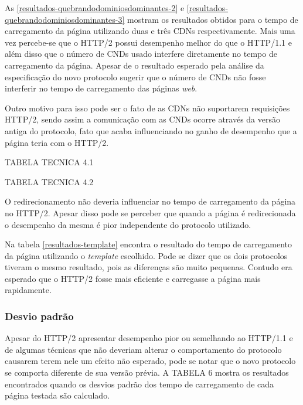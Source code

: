 



As \autoref{resultados-quebrandodominiosdominantes-2} e \autoref{resultados-quebrandodominiosdominantes-3} mostram os resultados obtidos para o tempo de carregamento da página utilizando duas e três CDNs respectivamente. Mais uma vez percebe-se que o HTTP/2 possui desempenho melhor do que o HTTP/1.1 e além disso que o número de CNDs usado interfere diretamente no tempo de carregamento da página. Apesar de o resultado esperado pela análise da especificação do novo protocolo sugerir que o número de CNDs não fosse interferir no tempo de carregamento das páginas \textit{web}.

Outro motivo para isso pode ser o fato de as CDNs não suportarem requisições HTTP/2, sendo assim a comunicação com as CNDs ocorre através da versão antiga do protocolo, fato que acaba influenciando no ganho de desempenho que a página teria com o HTTP/2.

TABELA TECNICA 4.1

TABELA TECNICA 4.2

O redirecionamento não deveria influenciar no tempo de carregamento da página no HTTP/2. Apesar disso pode se perceber que quando a página é redirecionada o desempenho da mesma é pior independente do protocolo utilizado.



Na tabela \autoref{resultados-template} encontra o resultado do tempo de carregamento da página utilizando o \textit{template} escolhido. Pode se dizer que os dois protocolos tiveram o mesmo resultado, pois as diferenças são muito pequenas. Contudo era esperado que o HTTP/2 fosse mais eficiente e carregasse a página mais rapidamente.

\subsubsection{Desvio padrão}
\label{desviopadrao}

Apesar do HTTP/2 apresentar desempenho pior ou semelhando ao HTTP/1.1 e de algumas técnicas que não deveriam alterar o comportamento do protocolo causarem terem nele um efeito não esperado, pode se notar que o novo protocolo se comporta diferente de sua versão prévia. A TABELA 6 mostra os resultados encontrados quando os desvios padrão dos tempo de carregamento de cada página testada são calculado.

